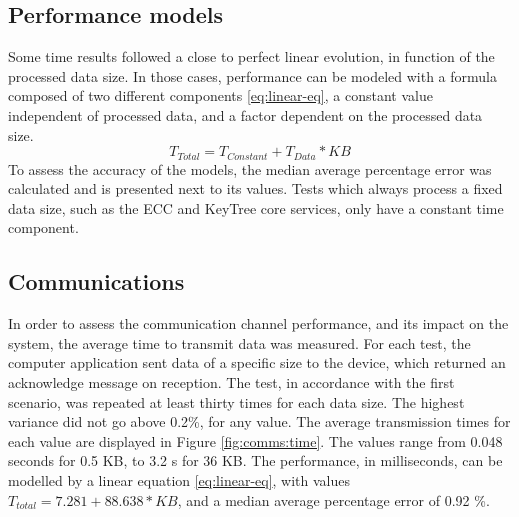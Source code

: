 \subsection{Performance models}\label{chap:evaluation:performance:models}

Some time results followed a close to perfect linear evolution, in function of the processed data size. In those cases, performance can be modeled with a formula composed of two different components \ref{eq:linear-eq}, a constant value independent of processed data, and a factor dependent on the processed data size.
\begin{equation}
	\label{eq:linear-eq}
	T_{Total} = T_{Constant} + T_{Data} * KB
\end{equation}
To assess the accuracy of the models, the median average percentage error was calculated and is presented next to its values. Tests which always process a fixed data size, such as the ECC and KeyTree core services, only have a constant time component.

\subsection{Communications}\label{chap:evaluation:performance:comms}

In order to assess the communication channel performance, and its impact on the system, the average time to transmit data was measured. For each test, the computer application sent data of a specific size to the device, which returned an acknowledge message on reception. The test, in accordance with the first scenario, was repeated at least thirty times for each data size. The highest variance did not go above 0.2\%, for any value.
The average transmission times for each value are displayed in Figure \ref{fig:comms:time}.
The values range from 0.048 seconds for 0.5 KB, to 3.2 s for 36 KB.
The performance, in milliseconds, can be modelled by a linear equation \ref{eq:linear-eq}, with values \(T_{total} = 7.281 + 88.638 * KB\), and a median average percentage error of 0.92 \%.

